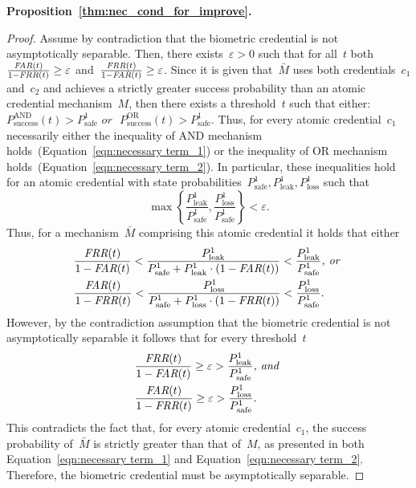 \documentclass[conference,compsoc]{IEEEtran}
\begin{document}
\medskip
\noindent
\textbf{Proposition~\ref{thm:nec_cond_for_improve}.}
\begin{proof}
    Assume by contradiction that the biometric credential is not asymptotically separable. Then, there exists~$\varepsilon > 0$ such that for all~$t$ both~$\frac{\textit{FAR}(t)}{1-\textit{FRR}(t)} \ge \varepsilon$ and~$\frac{\textit{FRR}(t)}{1-\textit{FAR}(t)} \ge \varepsilon$. Since it is given that~$\bar{M}$ uses both credentials~$c_1$ and~$c_2$ and achieves a strictly greater success probability than an atomic credential mechanism~$M$, then there exists a threshold~$t$ such that either:~$P^{\text{AND}}_{\text{success}}(t) > P^1_{\text{safe}} \textit{ or }$ $P^{\text{OR}}_{\text{success}}(t) > P^1_{\text{safe}}$. Thus, for every atomic credential~$c_1$ necessarily either the inequality of \textsc{AND} mechanism holds~(Equation~\ref{eqn:necessary term_1}) or the inequality of \textsc{OR} mechanism holds~(Equation~\ref{eqn:necessary term_2}). In particular, these inequalities hold for an atomic credential with state probabilities~$P^{1}_{\text{safe}}, P^{1}_{\text{leak}}, P^{1}_{\text{loss}}$ such that
    \begin{equation*}
        \max\left\{\frac{P^{1}_{\text{leak}}}{P^{1}_{\text{safe}}}, \frac{P^{1}_{\text{loss}}}{P^{1}_{\text{safe}}}\right\} < \varepsilon.
    \end{equation*}
    Thus, for a mechanism~$\bar{M}$ comprising this atomic credential it holds that either
    \begin{equation*}
        \begin{aligned}
        &\frac{\textit{FRR}(t)}{1-\textit{FAR}(t)} < \frac{P^{1}_{\text{leak}}}{P^{1}_{\text{safe}}+P^{1}_{\text{leak}}\cdot(1-\textit{FAR}(t))} < \frac{P^{1}_{\text{leak}}}{P^{1}_{\text{safe}}} \textit{, or }\\
        &\frac{\textit{FAR}(t)}{1-\textit{FRR}(t)} < \frac{P^{1}_{\text{loss}}}{P^{1}_{\text{safe}}+P^{1}_{\text{loss}}\cdot(1-\textit{FRR}(t))} < \frac{P^{1}_{\text{loss}}}{P^{1}_{\text{safe}}}.
        \end{aligned}
    \end{equation*} 
    However, by the contradiction assumption that the biometric credential is not asymptotically separable it follows that for every threshold~$t$
    \begin{equation*}
        \begin{aligned}
            &\frac{\textit{FRR}(t)}{1-\textit{FAR}(t)} \ge \varepsilon > \frac{P^{1}_{\text{leak}}}{P^{1}_{\text{safe}}} \textit{, and } \\
            &\frac{\textit{FAR}(t)}{1-\textit{FRR}(t)} \ge \varepsilon > \frac{P^{1}_{\text{loss}}}{P^{1}_{\text{safe}}}.
        \end{aligned}
    \end{equation*} 
    This contradicts the fact that, for every atomic credential~$c_1$, the success probability of~$\bar{M}$ is strictly greater than that of~$M$, as presented in both Equation~\ref{eqn:necessary term_1} and Equation~\ref{eqn:necessary term_2}. Therefore, the biometric credential must be asymptotically separable.
\end{proof}
\end{document}
